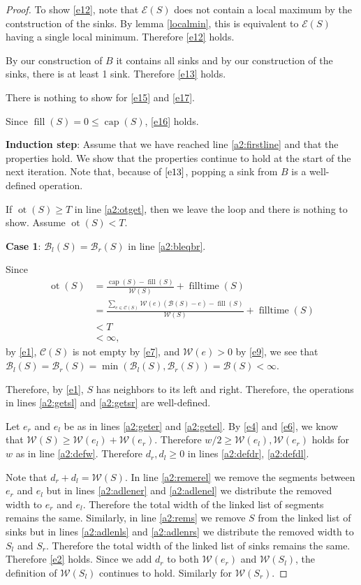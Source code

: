 \documentclass[11pt,a4paper]{article}
\DeclareMathOperator{\capp}{cap}
\DeclareMathOperator{\ot}{ot}
\DeclareMathOperator{\Fill}{fill}
\DeclareMathOperator{\filltime}{filltime}
\begin{document}
\begin{proof}
To show \ref{e12}, note that $\mathcal{E}(S)$ does not contain a local maximum by the contstruction of the sinks.
By lemma \ref{localmin}, this is equivalent to $\mathcal{E}(S)$ having a single local minimum.
Therefore \ref{e12} holds.

By our construction of $B$ it contains all sinks and by our construction of the sinks, there is at least 1 sink.
Therefore \ref{e13} holds.

There is nothing to show for \ref{e15} and \ref{e17}.

Since $\Fill(S) = 0 \le \capp(S)$, \ref{e16} holds.

\textbf{Induction step}: Assume that we have reached line \ref{a2:firstline} and that the properties hold.
We show that the properties continue to hold at the start of the next iteration.
Note that, because of $\ref{e13}$, popping a sink from $B$ is a well-defined operation.

If $\ot(S)\ge T$ in line \ref{a2:otget}, then we leave the loop and there is nothing to show.
Assume $\ot(S) < T$.

\textbf{Case 1}: $\mathcal{B}_l(S) = \mathcal{B}_r(S)$ in line \ref{a2:bleqbr}.

Since 
\begin{align*}
    \ot(S) &= \frac{\capp(S) - \Fill(S)}{\mathcal{W}(S)} + \filltime(S) \\
           &= \frac{\sum_{e\in\mathcal{C}(S)} \mathcal{W}(e)(\mathcal{B}(S)-e) - \Fill(S)}{\mathcal{W}(S)} + \filltime(S) \\
           &< T \\
           &< \infty,
\end{align*}
by \ref{e1}, $\mathcal{C}(S)$ is not empty by \ref{e7}, and $\mathcal{W}(e) > 0$ by \ref{e9},
we see that $\mathcal{B}_l(S) = \mathcal{B}_r(S) = \min(\mathcal{B}_l(S), \mathcal{B}_r(S)) = \mathcal{B}(S) < \infty$.

Therefore, by \ref{e1}, $S$ has neighbors to its left and right.
Therefore, the operations in lines \ref{a2:getsl} and \ref{a2:getsr} are well-defined.

Let $e_r$ and $e_l$ be as in lines \ref{a2:geter} and \ref{a2:getel}.
By \ref{e4} and \ref{e6}, we know that $\mathcal{W}(S) \ge \mathcal{W}(e_l) + \mathcal{W}(e_r)$.
Therefore $w/2 \ge \mathcal{W}(e_l), \mathcal{W}(e_r)$ holds for $w$ as in line \ref{a2:defw}.
Therefore $d_r, d_l \ge 0$ in lines \ref{a2:defdr}, \ref{a2:defdl}.

Note that $d_r + d_l = \mathcal{W}(S)$.
In line \ref{a2:remerel} we remove the segments between $e_r$ and $e_l$ but in lines \ref{a2:adlener} and \ref{a2:adlenel} we distribute the removed width to $e_r$ and $e_l$.
Therefore the total width of the linked list of segments remains the same.
Similarly, in line \ref{a2:rems} we remove $S$ from the linked list of sinks but in lines \ref{a2:adlenls} and \ref{a2:adlenrs} we distribute the removed width to $S_l$ and $S_r$.
Therefore the total width of the linked list of sinks remains the same.
Therefore \ref{e2} holds.
Since we add $d_r$ to both $\mathcal{W}(e_r)$ and $\mathcal{W}(S_l)$, the definition of $\mathcal{W}(S_l)$ continues to hold.
Similarly for $\mathcal{W}(S_r)$.


\end{proof}
\end{document}
